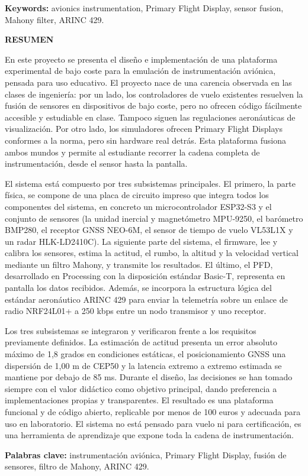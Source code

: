 \vspace{0.3cm}

\noindent\textbf{Keywords:} avionics instrumentation, Primary Flight
Display, sensor fusion, Mahony filter, ARINC 429.

\vfill

\newpage

\thispagestyle{plain}

\vfill

{\Large\bfseries RESUMEN}

\vspace{-0.5cm}

\hrulefill

En este proyecto se presenta el diseño e implementación de una plataforma experimental de bajo coste para la emulación de instrumentación aviónica, pensada para uso educativo. El proyecto nace de una carencia observada en las clases de ingeniería: por un lado, los controladores de vuelo existentes resuelven la fusión de sensores en dispositivos de bajo coste, pero no ofrecen código fácilmente accesible y estudiable en clase. Tampoco siguen las regulaciones aeronáuticas de visualización. Por otro lado, los simuladores ofrecen Primary Flight Displays conformes a la norma, pero sin hardware real detrás. Esta plataforma fusiona ambos mundos y permite al estudiante recorrer la cadena completa de instrumentación, desde el sensor hasta la pantalla.

El sistema está compuesto por tres subsistemas principales. El primero, la parte física, se compone de una placa de circuito impreso que integra todos los componentes del sistema, en concreto un microcontrolador ESP32-S3 y el conjunto de sensores (la unidad inercial y magnetómetro MPU-9250, el barómetro BMP280, el receptor GNSS NEO-6M, el sensor de tiempo de vuelo VL53L1X y un radar HLK-LD2410C). La siguiente parte del sistema, el firmware, lee y calibra los sensores, estima la actitud, el rumbo, la altitud y la velocidad vertical mediante un filtro Mahony, y transmite los resultados. El último, el PFD, desarrollado en Processing con la disposición estándar Basic-T, representa en pantalla los datos recibidos. Además, se incorpora la estructura lógica del estándar aeronáutico ARINC 429 para enviar la telemetría sobre un enlace de radio NRF24L01+ a 250 kbps entre un nodo transmisor y uno receptor.

Los tres subsistemas se integraron y verificaron frente a los requisitos previamente definidos. La estimación de actitud presenta un error absoluto máximo de 1,8 grados en condiciones estáticas, el posicionamiento GNSS una dispersión de 1,00 m de CEP50 y la latencia extremo a extremo estimada se mantiene por debajo de 85 ms. Durante el diseño, las decisiones se han tomado siempre con el valor didáctico como objetivo principal, dando preferencia a implementaciones propias y transparentes. El resultado es una plataforma funcional y de código abierto, replicable por menos de 100 euros y adecuada para uso en laboratorio. El sistema no está pensado para vuelo ni para certificación, es una herramienta de aprendizaje que expone toda la cadena de instrumentación.

\vspace{0.3cm}

\noindent\textbf{Palabras clave:} instrumentación aviónica, Primary Flight
Display, fusión de sensores, filtro de Mahony, ARINC 429.

\vfill